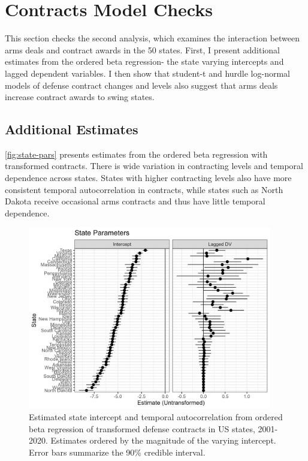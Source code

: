 \documentclass[12pt]{article}
\begin{document}
\section{Contracts Model Checks} 

This section checks the second analysis, which examines the interaction between arms deals and contract awards in the 50 states. 
First, I present additional estimates from the ordered beta regression- the state varying intercepts and lagged dependent variables. 
I then show that student-t and hurdle log-normal models of defense contract changes and levels also suggest that arms deals increase contract awards to swing states. 


\subsection{Additional Estimates}


\autoref{fig:state-pars} presents estimates from the ordered beta regression with transformed contracts. 
There is wide variation in contracting levels and temporal dependence across states. 
States with higher contracting levels also have more consistent temporal autocorrelation in contracts, while states such as North Dakota receive occasional arms contracts and thus have little temporal dependence. 

\begin{figure}[htpb]
	\centering
		\includegraphics[width=0.95\textwidth]{state-pars.png}
	\caption{Estimated state intercept and temporal autocorrelation from ordered beta regression of transformed defense contracts in US states, 2001-2020. Estimates ordered by the magnitude of the varying intercept. Error bars summarize the 90\% credible interval.}
	\label{fig:state-pars}
\end{figure}
\end{document}

